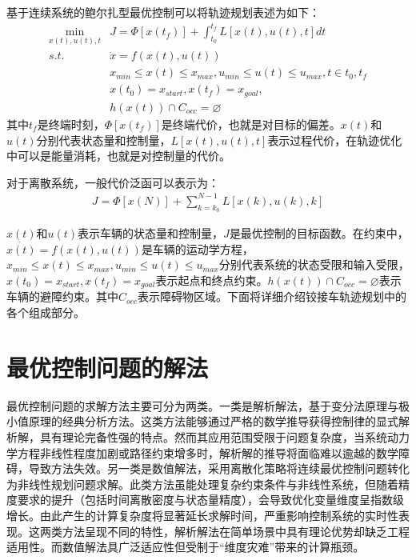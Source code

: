 \documentclass[master,academic]{ysuthesis} %
\begin{document}
	基于连续系统的鲍尔扎型最优控制可以将轨迹规划表述为如下：
	\begin{equation}
		\begin{aligned}
			\min_{x(t),u(t),t} &J = \Phi[x(t_f)]+\int_{t_0}^{t_f}L[x(t),u(t),t]dt\\
			s.t. \ \ \ &\dot{x} = f(x(t),u(t))\\
			&x_{min}\le x(t) \le x_{max},u_{min}\le u(t) \le u_{max},t \in{t_0,t_f}\\
			&x(t_0)=x_{start},x(t_f)=x_{goal},\\
			&h(x(t))\cap C_{occ}=\varnothing 
		\end{aligned}
	\end{equation}
	其中$t_f$是终端时刻，$\Phi[x(t_f)]$是终端代价，也就是对目标的偏差。$x(t)$和$u(t)$分别代表状态量和控制量，$L[x(t),u(t),t]$表示过程代价，在轨迹优化中可以是能量消耗，也就是对控制量的代价。
	
	对于离散系统，一般代价泛函可以表示为：
	\begin{equation}
		\begin{aligned}
			J = \Phi[x(N)]+\sum_{k=k_0}^{N-1}L[x(k),u(k),k]
		\end{aligned}
	\end{equation}

	$x(t)$和$u(t)$表示车辆的状态量和控制量，$J$是最优控制的目标函数。在约束中，$\dot{x(t)}=f(x(t),u(t))$是车辆的运动学方程，$x_{min}\le x(t) \le x_{max},u_{min}\le u(t) \le u_{max}$分别代表系统的状态受限和输入受限，$x(t_0)=x_{start},x(t_f)=x_{goal}$表示起点和终点约束。$h(x(t))\cap C_{occ}=\varnothing$表示车辆的避障约束。其中$C_{occ}$表示障碍物区域。下面将详细介绍铰接车轨迹规划中的各个组成部分。

	\section{最优控制问题的解法}
	最优控制问题的求解方法主要可分为两类。一类是​解析解法，基于变分法原理与极小值原理的经典分析方法。这类方法能够通过严格的数学推导获得控制律的显式解析解，具有理论完备性强的特点。然而其应用范围受限于问题复杂度，当系统动力学方程非线性程度加剧或路径约束增多时，解析解的推导将面临难以逾越的数学障碍，导致方法失效。另一类是​数值解法，采用离散化策略将连续最优控制问题转化为非线性规划问题求解。此类方法虽能处理复杂约束条件与非线性系统，但随着精度要求的提升（包括时间离散密度与状态量精度），会导致优化变量维度呈指数级增长。由此产生的计算复杂度将显著延长求解时间，严重影响控制系统的实时性表现。这两类方法呈现不同的特性，解析解法在简单场景中具有理论优势却缺乏工程适用性。而数值解法具广泛适应性但受制于“维度灾难”带来的计算瓶颈。
\end{document}
